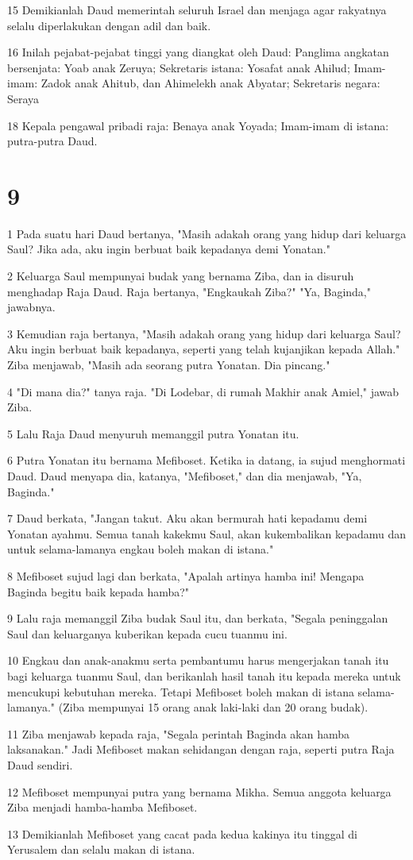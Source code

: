 \par 15 Demikianlah Daud memerintah seluruh Israel dan menjaga agar rakyatnya selalu diperlakukan dengan adil dan baik.
\par 16 Inilah pejabat-pejabat tinggi yang diangkat oleh Daud: Panglima angkatan bersenjata: Yoab anak Zeruya; Sekretaris istana: Yosafat anak Ahilud; Imam-imam: Zadok anak Ahitub, dan Ahimelekh anak Abyatar; Sekretaris negara: Seraya
\par 18 Kepala pengawal pribadi raja: Benaya anak Yoyada; Imam-imam di istana: putra-putra Daud.

\chapter{9}

\par 1 Pada suatu hari Daud bertanya, "Masih adakah orang yang hidup dari keluarga Saul? Jika ada, aku ingin berbuat baik kepadanya demi Yonatan."
\par 2 Keluarga Saul mempunyai budak yang bernama Ziba, dan ia disuruh menghadap Raja Daud. Raja bertanya, "Engkaukah Ziba?" "Ya, Baginda," jawabnya.
\par 3 Kemudian raja bertanya, "Masih adakah orang yang hidup dari keluarga Saul? Aku ingin berbuat baik kepadanya, seperti yang telah kujanjikan kepada Allah." Ziba menjawab, "Masih ada seorang putra Yonatan. Dia pincang."
\par 4 "Di mana dia?" tanya raja. "Di Lodebar, di rumah Makhir anak Amiel," jawab Ziba.
\par 5 Lalu Raja Daud menyuruh memanggil putra Yonatan itu.
\par 6 Putra Yonatan itu bernama Mefiboset. Ketika ia datang, ia sujud menghormati Daud. Daud menyapa dia, katanya, "Mefiboset," dan dia menjawab, "Ya, Baginda."
\par 7 Daud berkata, "Jangan takut. Aku akan bermurah hati kepadamu demi Yonatan ayahmu. Semua tanah kakekmu Saul, akan kukembalikan kepadamu dan untuk selama-lamanya engkau boleh makan di istana."
\par 8 Mefiboset sujud lagi dan berkata, "Apalah artinya hamba ini! Mengapa Baginda begitu baik kepada hamba?"
\par 9 Lalu raja memanggil Ziba budak Saul itu, dan berkata, "Segala peninggalan Saul dan keluarganya kuberikan kepada cucu tuanmu ini.
\par 10 Engkau dan anak-anakmu serta pembantumu harus mengerjakan tanah itu bagi keluarga tuanmu Saul, dan berikanlah hasil tanah itu kepada mereka untuk mencukupi kebutuhan mereka. Tetapi Mefiboset boleh makan di istana selama-lamanya." (Ziba mempunyai 15 orang anak laki-laki dan 20 orang budak).
\par 11 Ziba menjawab kepada raja, "Segala perintah Baginda akan hamba laksanakan." Jadi Mefiboset makan sehidangan dengan raja, seperti putra Raja Daud sendiri.
\par 12 Mefiboset mempunyai putra yang bernama Mikha. Semua anggota keluarga Ziba menjadi hamba-hamba Mefiboset.
\par 13 Demikianlah Mefiboset yang cacat pada kedua kakinya itu tinggal di Yerusalem dan selalu makan di istana.

